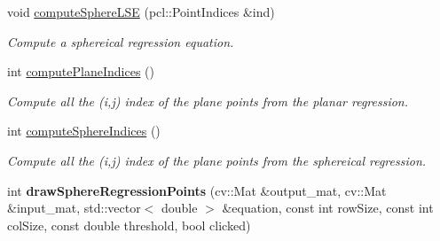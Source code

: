 \begin{DoxyCompactItemize}
void \hyperlink{class_plane_a60923e0c6d087076a234a9d5bd45d0fa}{compute\+Sphere\+L\+SE} (pcl\+::\+Point\+Indices \&ind)
\begin{DoxyCompactList}\small\item\em Compute a sphereical regression equation. \end{DoxyCompactList}\item 
\hypertarget{class_plane_a24415419c0c06e83f2016246a8d2ee40}{}\label{class_plane_a24415419c0c06e83f2016246a8d2ee40} 
int \hyperlink{class_plane_a24415419c0c06e83f2016246a8d2ee40}{compute\+Plane\+Indices} ()
\begin{DoxyCompactList}\small\item\em Compute all the (i,j) index of the plane points from the planar regression. \end{DoxyCompactList}\item 
\hypertarget{class_plane_a279bfd98317431edcdefe43004bb257f}{}\label{class_plane_a279bfd98317431edcdefe43004bb257f} 
int \hyperlink{class_plane_a279bfd98317431edcdefe43004bb257f}{compute\+Sphere\+Indices} ()
\begin{DoxyCompactList}\small\item\em Compute all the (i,j) index of the plane points from the sphereical regression. \end{DoxyCompactList}\item 
\hypertarget{class_plane_a12c28b7eeb8cdef5451e2e90704e0673}{}\label{class_plane_a12c28b7eeb8cdef5451e2e90704e0673} 
int {\bfseries draw\+Sphere\+Regression\+Points} (cv\+::\+Mat \&output\+\_\+mat, cv\+::\+Mat \&input\+\_\+mat, std\+::vector$<$ double $>$ \&equation, const int row\+Size, const int col\+Size, const double threshold, bool clicked)
\end{DoxyCompactItemize}

